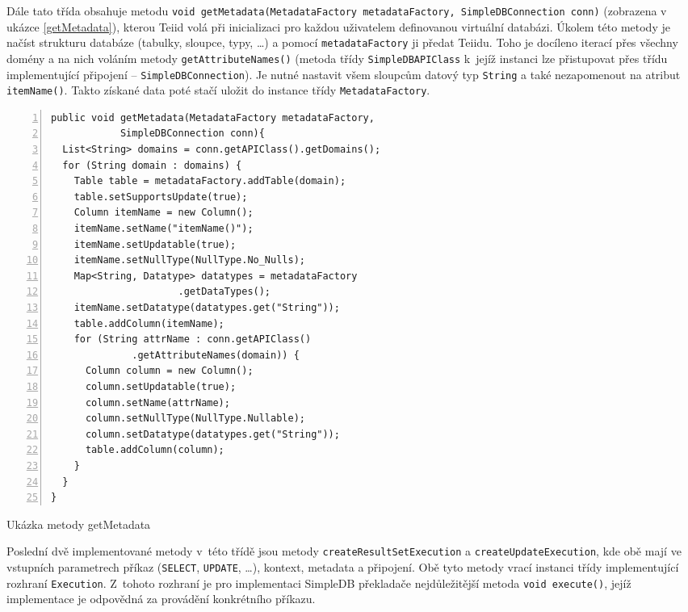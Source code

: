 \documentclass[oneside,12pt]{fithesis2}
\begin{document}
Dále tato třída obsahuje metodu \label{getMetadataChapter}\texttt{void getMetadata(Metadata\allowbreak Factory metadataFactory, SimpleDBConnection conn)} (zobrazena v ukázce \ref{getMetadata}), kterou Teiid volá při inicializaci pro každou uživatelem definovanou virtuální databázi. Úkolem této metody je načíst strukturu databáze (tabulky, sloupce, typy, \dots) a pomocí \texttt{metadataFactory} ji předat Teiidu. Toho je docíleno iterací přes všechny domény a na nich voláním metody \texttt{getAttributeNames()} (metoda třídy \texttt{SimpleDBAPIClass} k~jejíž instanci lze přistupovat přes třídu implementující připojení -- \texttt{SimpleDB\allowbreak Connection}). Je nutné nastavit všem sloupcům datový typ \texttt{String} a také nezapomenout na atribut \texttt{itemName()}. Takto získané data poté stačí uložit do instance třídy \texttt{MetadataFactory}.

\begin{ukazka}[h]
 \begin{Verbatim}[fontsize=\small,numbers=left]
public void getMetadata(MetadataFactory metadataFactory, 
			SimpleDBConnection conn){
  List<String> domains = conn.getAPIClass().getDomains();
  for (String domain : domains) {
    Table table = metadataFactory.addTable(domain);
    table.setSupportsUpdate(true);
    Column itemName = new Column();
    itemName.setName("itemName()");
    itemName.setUpdatable(true);
    itemName.setNullType(NullType.No_Nulls);
    Map<String, Datatype> datatypes = metadataFactory
				      .getDataTypes();
    itemName.setDatatype(datatypes.get("String"));
    table.addColumn(itemName);
    for (String attrName : conn.getAPIClass()
			  .getAttributeNames(domain)) {
      Column column = new Column();
      column.setUpdatable(true);
      column.setName(attrName);
      column.setNullType(NullType.Nullable);
      column.setDatatype(datatypes.get("String"));
      table.addColumn(column);
    }
  }
}
 \end{Verbatim}
\caption{Ukázka metody getMetadata}
\label{getMetadata}
\end{ukazka}

Poslední dvě implementované metody v~této třídě jsou metody \texttt{createResultSetExecution} a \texttt{createUpdateExecution}, kde obě mají ve vstupních parametrech příkaz (\texttt{SELECT}, \texttt{UPDATE}, \dots), kontext, metadata a připojení. Obě tyto metody vrací instanci třídy implementující rozhraní \texttt{Execution}. Z~tohoto rozhraní je pro implementaci SimpleDB překladače nejdůležitější metoda \texttt{void execute()}, jejíž implementace je odpovědná za provádění konkrétního příkazu.
\end{document}
